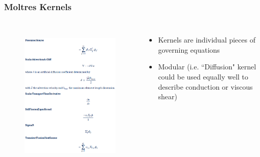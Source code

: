 \begin{frame}
  \frametitle{Moltres Kernels}
    \begin{columns}
    \column[t]{6cm}
               \begin{figure}[t]
                  \vspace*{-0.15in}
                 \hspace*{-0.35in}
                \includegraphics[height=1.15\textwidth]{./images/kernels4.png}
               \end{figure}   

    \column[t]{6cm}
	\begin{itemize}
		\item Kernels are individual pieces of governing equations
		\item Modular (i.e. ``Diffusion" kernel could be used equally well to describe conduction or viscous shear)
	\end{itemize}
    \end{columns}  
  
\end{frame}

